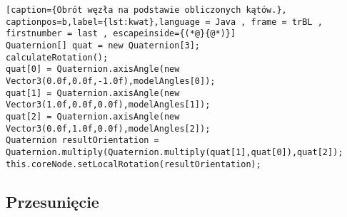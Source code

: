 \begin{lstlisting}[caption={Obrót węzła na podstawie obliczonych kątów.}, captionpos=b,label={lst:kwat},language = Java , frame = trBL , firstnumber = last , escapeinside={(*@}{@*)}]     
Quaternion[] quat = new Quaternion[3];
calculateRotation();
quat[0] = Quaternion.axisAngle(new Vector3(0.0f,0.0f,-1.0f),modelAngles[0]); 
quat[1] = Quaternion.axisAngle(new Vector3(1.0f,0.0f,0.0f),modelAngles[1]);
quat[2] = Quaternion.axisAngle(new Vector3(0.0f,1.0f,0.0f),modelAngles[2]);
Quaternion resultOrientation = Quaternion.multiply(Quaternion.multiply(quat[1],quat[0]),quat[2]);
this.coreNode.setLocalRotation(resultOrientation);
\end{lstlisting}
	
	\subsection{Przesunięcie}
	\label{subsec:przesuniecie}	
